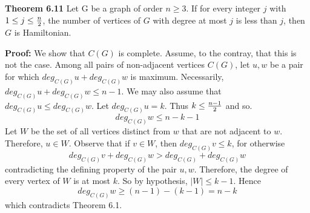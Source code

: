 \nopagenumbers
{\bf Theorem 6.11}
\vskip 6pt
{Let G be a graph of order $ n \geq 3 $. If for every integer $j$ with $ 1 \leq j \leq {n\over 2}$, the number of vertices of $G$
with degree at most $j$ is less than $j$, then $G$ is Hamiltonian.}

\vskip 10pt
{\bf Proof:}
\vskip 6pt
We show that $C(G) $ is complete. Assume, to the contray, that this is not the case. Among all pairs of non-adjacent vertices $C(G)$, let
$u,w$ be a pair for which $deg_{C(G)}u+deg_{C(G)} w$ is maximum. Necessarily, $deg_{C(G)}u+deg_{C(G)}w \leq n-1$. We may also assume that
$deg_{C(G)}u \leq deg_{C(G)}w$. Let $deg_{C(G)}u=k$. Thus $k \leq {{n-1}\over 2}$ and so. $$deg_{C(G)}w \leq n-k-1$$ Let $W$ be the set of all
vertices distinct from $w$ that are not adjacent to $w$. Therefore, $u \in W$. Observe that if $v \in W$, then $deg_{C(G)}v \leq k$, for otherwise
$$deg_{C(G)}v+deg_{C(G)}w > deg_{C(G)}+deg_{C(G)}w$$ contradicting the defining property of the pair $u,w$. Therefore, the degree of every vertex of
$W$ is at most $k$. So by hypothesis, $|W| \leq k-1 $. Hence $$deg_{C(G)}w \geq (n-1)-(k-1)=n-k$$ which contradicts Theorem 6.1.
\vfill\eject
